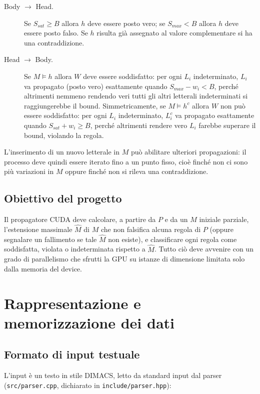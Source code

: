 \documentclass[11pt,a4paper]{article}
\begin{document}
\begin{description}
\item[Body $\to$ Head.] Se $S_{sat} \ge B$ allora $h$ deve essere posto vero; se $S_{max} < B$
allora $h$ deve essere posto falso. Se $h$ risulta già assegnato al valore complementare si ha una
contraddizione.
\item[Head $\to$ Body.] Se $M \models h$ allora $W$ deve essere soddisfatto: per ogni $L_i$
indeterminato, $L_i$ va propagato (posto vero) esattamente quando $S_{max} - w_i < B$, perché
altrimenti nemmeno rendendo veri tutti gli altri letterali indeterminati si raggiungerebbe il
bound. Simmetricamente, se $M \models h^c$ allora $W$ non può essere soddisfatto: per ogni $L_i$
indeterminato, $L_i^c$ va propagato esattamente quando $S_{sat} + w_i \ge B$, perché altrimenti
rendere vero $L_i$ farebbe superare il bound, violando la regola.
\end{description}

L'inserimento di un nuovo letterale in $M$ può abilitare ulteriori propagazioni: il processo deve
quindi essere iterato fino a un punto fisso, cioè finché non ci sono più variazioni in $M$ oppure
finché non si rileva una contraddizione.

\subsection{Obiettivo del progetto}

Il propagatore CUDA deve calcolare, a partire da $P$ e da un $M$ iniziale parziale, l'estensione
massimale $\hat M$ di $M$ che non falsifica alcuna regola di $P$ (oppure segnalare un fallimento se
tale $\hat M$ non esiste), e classificare ogni regola come soddisfatta, violata o indeterminata
rispetto a $\hat M$. Tutto ciò deve avvenire con un grado di parallelismo che sfrutti la GPU su
istanze di dimensione limitata solo dalla memoria del device.

\section{Rappresentazione e memorizzazione dei dati}
\label{sec:dati}

\subsection{Formato di input testuale}

L'input è un testo in stile DIMACS, letto da standard input dal parser
(\texttt{src/parser.cpp}, dichiarato in \texttt{include/parser.hpp}):
\end{document}

